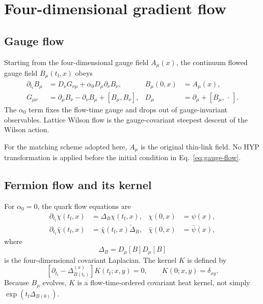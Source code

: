 \documentclass[11pt]{article}
\numberwithin{equation}{section}
\newcommand{\tf}{t_{\mathrm f}}
\begin{document}
\section{Four-dimensional gradient flow}

\subsection{Gauge flow}

Starting from the four-dimensional gauge field \(A_\mu(x)\), the continuum
flowed gauge field \(B_\mu(\tf,x)\) obeys
\begin{align}
  \partial_{\tf} B_\mu
  &=
  D_\nu G_{\nu\mu}
  +\alpha_0 D_\mu\partial_\nu B_\nu,
  &
  B_\mu(0,x)&=A_\mu(x),
  \label{eq:gauge-flow}
  \\
  G_{\mu\nu}
  &=
  \partial_\mu B_\nu-\partial_\nu B_\mu+[B_\mu,B_\nu],
  &
  D_\mu&=\partial_\mu+[B_\mu,\,\cdot\,].
\end{align}
The \(\alpha_0\) term fixes the flow-time gauge and drops out of gauge-invariant
observables. Lattice Wilson flow is the gauge-covariant steepest descent of the
Wilson action.

For the matching scheme adopted here, \(A_\mu\) is the original thin-link
field. No HYP transformation is applied before the initial condition in
Eq.~\eqref{eq:gauge-flow}.

\subsection{Fermion flow and its kernel}

For \(\alpha_0=0\), the quark flow equations are
\begin{align}
  \partial_{\tf}\chi(\tf,x)
  &=\Delta_B\chi(\tf,x),
  &\chi(0,x)&=\psi(x),
  \\
  \partial_{\tf}\bar\chi(\tf,x)
  &=\bar\chi(\tf,x)\overleftarrow{\Delta}_B,
  &\bar\chi(0,x)&=\bar\psi(x),
  \label{eq:fermion-flow}
\end{align}
where
\begin{equation}
  \Delta_B=D_\mu[B]D_\mu[B]
\end{equation}
is the four-dimensional covariant Laplacian. The kernel \(K\) is defined by
\begin{equation}
  \left[\partial_{\tf}-\Delta_{B(\tf)}^{(x)}\right]
  K(\tf;x,y)=0,
  \qquad
  K(0;x,y)=\delta_{xy}.
  \label{eq:kernel-equation}
\end{equation}
Because \(B_\mu\) evolves, \(K\) is a flow-time-ordered covariant heat kernel,
not simply \(\exp(\tf\Delta_{B(0)})\).
\end{document}
